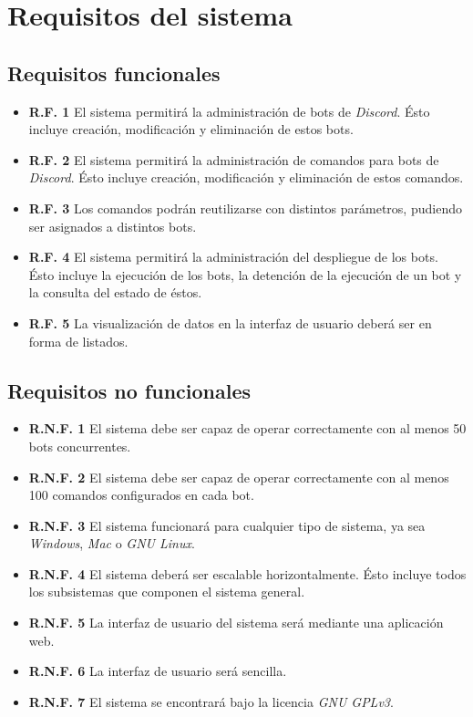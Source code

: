 \section{Requisitos del sistema}

\subsection{Requisitos funcionales}

\begin{itemize}
	\item \textbf{R.F. 1} El sistema permitirá la administración de bots de \textit{Discord}. Ésto incluye creación, modificación y eliminación de estos bots.
	\item \textbf{R.F. 2} El sistema permitirá la administración de comandos para bots de \textit{Discord}. Ésto incluye creación, modificación y eliminación de estos comandos.
	\item \textbf{R.F. 3} Los comandos podrán reutilizarse con distintos parámetros, pudiendo ser asignados a distintos bots.
	\item \textbf{R.F. 4} El sistema permitirá la administración del despliegue de los bots. Ésto incluye la ejecución de los bots, la detención de la ejecución de un bot y la consulta del estado de éstos.
	\item \textbf{R.F. 5} La visualización de datos en la interfaz de usuario deberá ser en forma de listados.
\end{itemize}

\subsection{Requisitos no funcionales}

\begin{itemize}
	\item \textbf{R.N.F. 1} El sistema debe ser capaz de operar correctamente con al menos 50 bots concurrentes.
	\item \textbf{R.N.F. 2} El sistema debe ser capaz de operar correctamente con al menos 100 comandos configurados en cada bot.
	\item \textbf{R.N.F. 3} El sistema funcionará para cualquier tipo de sistema, ya sea \textit{Windows}, \textit{Mac} o \textit{GNU Linux}.
	\item \textbf{R.N.F. 4} El sistema deberá ser escalable horizontalmente. Ésto incluye todos los subsistemas que componen el sistema general.
	\item \textbf{R.N.F. 5} La interfaz de usuario del sistema será mediante una aplicación web.
	\item \textbf{R.N.F. 6} La interfaz de usuario será sencilla.
	\item \textbf{R.N.F. 7} El sistema se encontrará bajo la licencia \textit{GNU GPLv3}.
\end{itemize}

